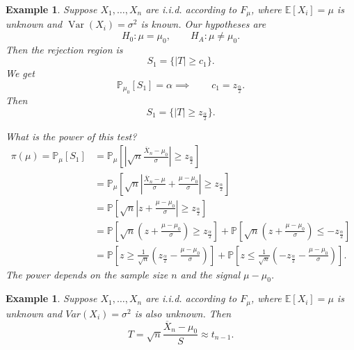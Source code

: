 \documentclass{tufte-handout}
\newcommand*\E{\mathbb{E}}
\renewcommand{\P}{\mathbb{P}}
\newtheorem{ex}[thm]{Example}
\theoremstyle{definition}
\begin{document}
\begin{ex}
	Suppose $X_1,\ldots,X_n$ are i.i.d. according to $F_\mu$, where $\E\left[X_i\right] =\mu$ is unknown and $\operatorname{Var}(X_i) = \sigma^2$ is known. Our hypotheses are \[
		H_0: \mu = \mu_0, \qquad H_A: \mu \ne \mu_0
	.\] Then the rejection region is \[
		S_1 = \{\left| T \right| \ge c_1\}
	.\] We get \[
		\P_{\mu_0}\left[S_1\right] = \alpha \implies \qquad c_1 = z_{\frac{\alpha}{2}}
	.\] Then \[
		S_1 = \{\left| T \right|\ge z_{\frac{\alpha}{2}}\}
	.\] 

	What is the power of this test?
	\begin{align*}
		\pi(\mu) = \P_\mu\left[S_1\right] &= \P_\mu\left[\left| \sqrt{n} \frac{\overline{X}_n-\mu_0}{\sigma} \right| \ge z_{\frac{\alpha}{2}}\right]  \\
										  &= \P_\mu\left[\sqrt{n} \left| \frac{\overline{X}_n-\mu}{\sigma}+\frac{\mu-\mu_{0}}{\sigma} \right| \ge z_{\frac{\alpha}{2}}\right] \\
										  &= \P\left[\sqrt{n} \left| z + \frac{\mu-\mu_0}{\sigma} \right|\ge z_{\frac{\alpha}{2}}\right]  \\
										  &= \P\left[\sqrt{n} \left( z+ \frac{\mu-\mu_0}{\sigma} \right) \ge z_{\frac{\alpha}{2}}\right] + \P\left[\sqrt{n} \left( z + \frac{\mu-\mu_0}{\sigma} \right) \le -z_{\frac{\alpha}{2}}\right] \\
										  &= \P\left[z \ge \frac{1}{\sqrt{n} }\left( z_{\frac{\alpha}{2}} - \frac{\mu-\mu_0}{\sigma} \right)\right] + \P\left[z \le \frac{1}{\sqrt{n} }\left( -z_{\frac{\alpha}{2}} - \frac{\mu-\mu_0}{\sigma} \right)\right]  
	.\end{align*}
	The power depends on the sample size $n$ and the signal $\mu-\mu_0$.
\end{ex}

\begin{ex}
	Suppose $X_1,\ldots,X_n$ are i.i.d. according to $F_\mu$, where $\E\left[X_i\right] =\mu$ is unknown and $Var(X_i) = \sigma^2$ is also unknown. Then \[
	T = \sqrt{n} \frac{\overline{X}_n-\mu_0}{S} \approx t_{n-1}
	.\] 
\end{ex}
\end{document}
